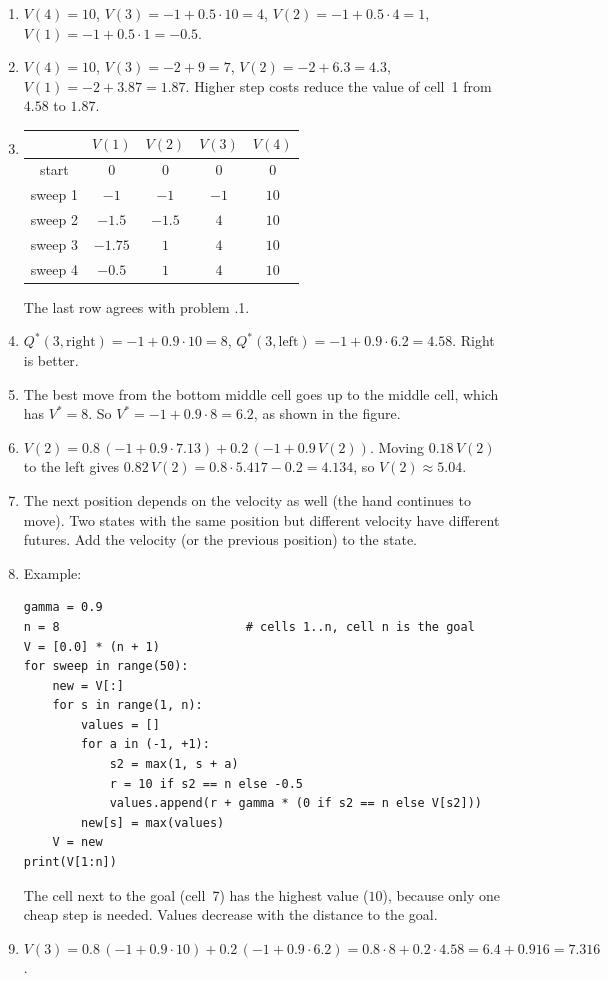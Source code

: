 \begin{enumerate}[label=\textbf{\ansnum.\arabic*}]
  \item $V(4)=10$, $V(3)=-1+0.5\cdot10=4$, $V(2)=-1+0.5\cdot4=1$, $V(1)=-1+0.5\cdot1=-0.5$.
  \item $V(4)=10$, $V(3)=-2+9=7$, $V(2)=-2+6.3=4.3$, $V(1)=-2+3.87=1.87$. Higher step costs reduce the value of cell~1 from $4.58$ to $1.87$.
  \item
\begin{center}
\begin{tabular}{c|cccc}
 & $V(1)$ & $V(2)$ & $V(3)$ & $V(4)$\\ \hline
start & $0$ & $0$ & $0$ & $0$\\
sweep 1 & $-1$ & $-1$ & $-1$ & $10$\\
sweep 2 & $-1.5$ & $-1.5$ & $4$ & $10$\\
sweep 3 & $-1.75$ & $1$ & $4$ & $10$\\
sweep 4 & $-0.5$ & $1$ & $4$ & $10$\\
\end{tabular}
\end{center}
  The last row agrees with problem \ansnum.1.
  \item $Q^*(3,\text{right})=-1+0.9\cdot10=8$, $Q^*(3,\text{left})=-1+0.9\cdot6.2=4.58$. Right is better.
  \item The best move from the bottom middle cell goes up to the middle cell, which has $V^*=8$. So $V^*=-1+0.9\cdot8=6.2$, as shown in the figure.
  \item $V(2)=0.8\,(-1+0.9\cdot7.13)+0.2\,(-1+0.9\,V(2))$. Moving $0.18\,V(2)$ to the left gives $0.82\,V(2)=0.8\cdot5.417-0.2=4.134$, so $V(2)\approx5.04$.
  \item The next position depends on the velocity as well (the hand continues to move). Two states with the same position but different velocity have different futures. Add the velocity (or the previous position) to the state.
  \item[\textbf{\ansnum.8}] Example:
\begin{verbatim}
gamma = 0.9
n = 8                          # cells 1..n, cell n is the goal
V = [0.0] * (n + 1)
for sweep in range(50):
    new = V[:]
    for s in range(1, n):
        values = []
        for a in (-1, +1):
            s2 = max(1, s + a)
            r = 10 if s2 == n else -0.5
            values.append(r + gamma * (0 if s2 == n else V[s2]))
        new[s] = max(values)
    V = new
print(V[1:n])
\end{verbatim}
  The cell next to the goal (cell~7) has the highest value ($10$), because only one cheap step is needed. Values decrease with the distance to the goal.
  \item[\textbf{\ansnum.9}] $V(3)=0.8\,(-1+0.9\cdot10)+0.2\,(-1+0.9\cdot6.2)=0.8\cdot8+0.2\cdot4.58=6.4+0.916=7.316$.
\end{enumerate}
